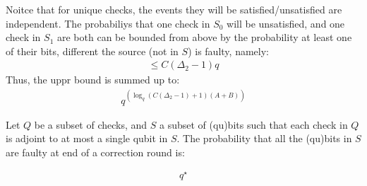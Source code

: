 \documentclass[manuscript,screen,review]{acmart}
\begin{document}
Noitce that for unique checks, the events they will be satisfied/unsatisfied are independent. The probabiliys that one check in $S_{0}$ will be unsatisfied, and one check in $S_{1}$ are both can be bounded from above by the probability at least one of their bits, different the source (not in $S$) is faulty, namely: 
\begin{equation*}
  \begin{split}
    \le C (\Delta_{2} - 1) q   
  \end{split}
\end{equation*}
Thus, the uppr bound is summed up to: 
\begin{equation*}
  \begin{split}
    q^{\left(  \log_{q} \left( C ( \Delta_{2} - 1) + 1\right) (A+B)    \right)} 
  \end{split}
\end{equation*}



\begin{claim}  
  Let $Q$ be a subset of checks, and $S$ a subset of (qu)bits such that each check in $Q$ is adjoint to at most a single qubit in $S$. The probability that all the (qu)bits in $S$ are faulty at end of a correction round is: 

  \begin{equation*}
    \begin{split}
      q^{\star}
    \end{split}
  \end{equation*}

\end{claim}
\end{document}
